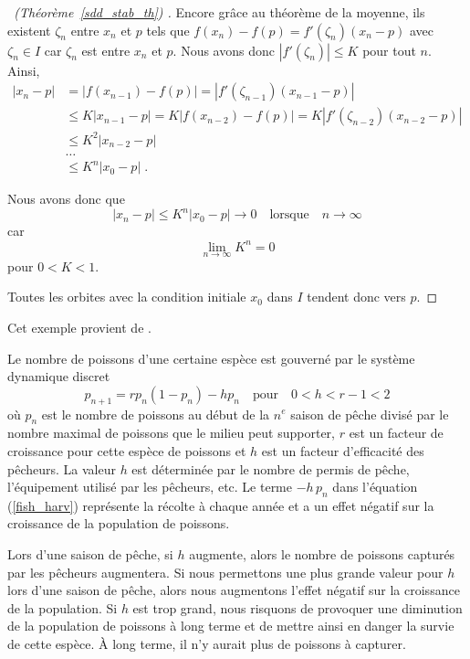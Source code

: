 {\begin{proof}[\UOproof\ (Théorème~\ref{sdd_stab_th}) \theory]
 Encore grâce au théorème de la moyenne, ils existent $\zeta_n$
entre $x_n$ et $p$ tels que
$f(x_n) - f(p) = f'(\zeta_n)(x_n - p)$
avec $\zeta_n \in I$ car $\zeta_n$ est entre $x_n$ et $p$.  Nous avons donc
$|f'(\zeta_n)|\leq K$ pour tout $n$.  Ainsi,
\begin{align*}
|x_n -p| &= |f(x_{n-1}) - f(p)| = |f'(\zeta_{n-1})(x_{n-1} - p)|\\
&\leq K |x_{n-1} - p| = K |f(x_{n-2}) - f(p)|
= K |f'(\zeta_{n-2})(x_{n-2} - p)| \\
&\leq K^2 |x_{n-2} -p|\\
& \ldots\\
&\leq K^n |x_0 - p| \; .
\end{align*}

 Nous avons donc que
\[
|x_n -p| \leq K^n |x_0-p|  \to 0 \quad \text{lorsque} \quad n \to \infty
\]
car
\[
\lim_{n\rightarrow \infty} K^n = 0
\]
pour $0<K<1$.

Toutes les orbites avec la condition initiale $x_0$ dans $I$
tendent donc vers $p$.
\end{proof}

\begin{egg}
Cet exemple provient de \cite{A}.

Le nombre de poissons d'une certaine espèce est gouverné par le
système dynamique discret
\begin{equation}\label{fish_harv}
p_{n+1} = r p_n (1-p_n) - h p_n  \quad \text{pour} \quad  0 < h < r
-1 < 2 
\end{equation}
où $p_n$ est le nombre de poissons au début de la $n^e$ saison de
pêche divisé par le nombre maximal de poissons que le milieu peut
supporter, $r$ est un facteur de croissance pour cette espèce de
poissons et $h$ est un facteur d'efficacité des pêcheurs. La valeur
$h$ est déterminée par le nombre de permis de pêche, l'équipement
utilisé par les pêcheurs, etc.  Le terme $-h\,p_n$ dans l'équation
(\ref{fish_harv}) représente la récolte à chaque année et a un effet
négatif sur la croissance de la population de poissons.

Lors d'une saison de pêche, si $h$ augmente, alors le nombre de
poissons capturés par les pêcheurs augmentera.  Si nous permettons une plus
grande valeur pour $h$ lors d'une saison de pêche, alors nous augmentons
l'effet négatif sur la croissance de la population.  Si $h$ est trop
grand, nous risquons de provoquer une diminution de la population de
poissons à long terme et de mettre ainsi en danger la survie de
cette espèce.  À long terme, il n'y aurait plus de poissons à capturer.


\end{egg}}
